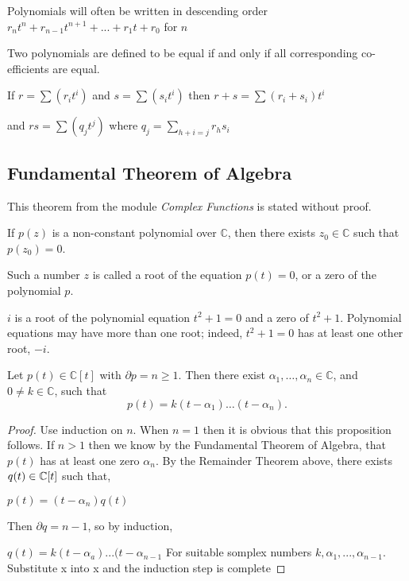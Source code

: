 Polynomials will often be written in descending order $r_n t^n + r_{n-1} t^{n+1} + ... + r_1 t + r_0$ for $n$

Two polynomials are defined to be equal if and only if all corresponding co-efficients are equal.

If $r = \sum (r_i t^i)$ and $s = \sum (s_i t^i)$ then $r+s = \sum (r_i + s_i)t^i$

and $rs = \sum (q_j t^j)$ where $q_j = \sum_{h+i=j} r_h s_i$

\subsection{Fundamental Theorem of Algebra} 
This theorem from the module \textit{Complex Functions} is stated without proof. 

\begin{theorem} \label{thm:fundamental-algebra}
    If $p(z)$ is a non-constant polynomial over $\mathbb{C}$, then there exists $z_0 \in \mathbb{C}$ such that $p\left(z_0\right)=0$.
\end{theorem}



Such a number $z$ is called a root of the equation $p(t)=0$, or a zero of the polynomial $p$. 

\begin{example}
    $i$ is a root of the polynomial equation $t^2+1=0$ and a zero of $t^2+1$. Polynomial equations may have more than one root; indeed, $t^2+1=0$ has at least one other root, $-i$.
\end{example}

\begin{proposition}
    Let $p(t) \in \mathbb{C}[t]$ with $\partial p=n \geq 1$. Then there exist $\alpha_1, \ldots, \alpha_n \in \mathbb{C}$, and $0 \neq k \in \mathbb{C}$, such that
    $$
    p(t)=k\left(t-\alpha_1\right) \ldots\left(t-\alpha_n\right).
    $$
\end{proposition}

\begin{proof}
    Use induction on $n$. When $n = 1$ then it is obvious that this proposition follows. If $n > 1$ then we know by the Fundamental Theorem of Algebra, that $p(t)$ has at least one zero $\alpha_n$. By the Remainder Theorem above, there exists $q(t) \in \mathbb C[t]$ such that,

    $p(t) = (t-\alpha_n) q(t)$
    
    Then $\partial q = n - 1$, so by induction,

    $q(t) = k(t-\alpha_a)...(t-\alpha_{n-1}$ For suitable somplex numbers $k,\alpha_1,...,\alpha_{n-1}$. Substitute x into x and the induction step is complete
\end{proof}

